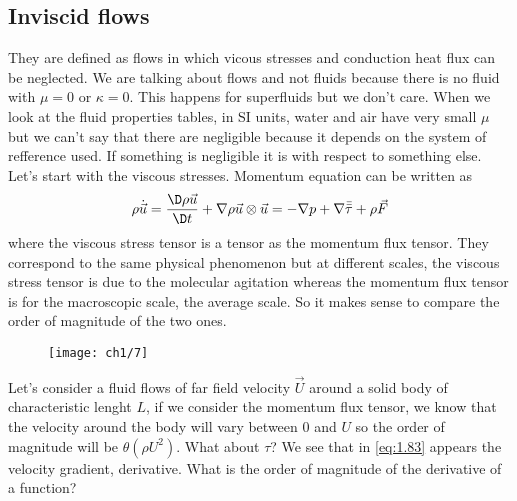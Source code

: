 	\subsection{Inviscid flows}
		They are defined as flows in which vicous stresses and conduction heat flux can be neglected.  We are talking about flows and not fluids because there is no fluid with $\mu = 0$ or $\kappa = 0$. This happens for superfluids but we don't care. When we look at the fluid properties tables, in SI units, water and air have very small $\mu$ but we can't say that there are negligible because it depends on the system of refference used. If something is negligible  it is with respect to something else. Let's start with the viscous stresses. Momentum equation can be written as 
		\begin{equation}
			\rho \dot{\vec{u}} = \frac{\D \rho \vec{u}}{\D t} + \nabla \rho \vec{u} \otimes \vec{u} = -\nabla p + \nabla \bar{\bar{\tau}} + \rho \vec{F}
		\end{equation}
		where the viscous stress tensor is a tensor as the momentum flux tensor. They correspond to the same physical phenomenon but at different scales, the viscous stress tensor is due to the molecular agitation whereas the momentum flux tensor is for the macroscopic scale, the average scale. So it makes sense to compare the order of magnitude of the two ones. \\
		
		\begin{wrapfigure}[6]{l}{4cm}
		\vspace{-8mm}
		\texttt{[image: ch1/7]}
		\end{wrapfigure}
		Let's consider a fluid flows of far field velocity $\vec{U}$ around a solid body of characteristic lenght $L$, if we consider the momentum flux tensor, we know that the velocity around the body will vary between 0 and $U$ so the order of magnitude will be $\theta (\rho U^2)$. What about $\tau$? We see that in \eqref{eq:1.83} appears the velocity gradient, derivative. What is the order of magnitude of the derivative of a function?  
		
